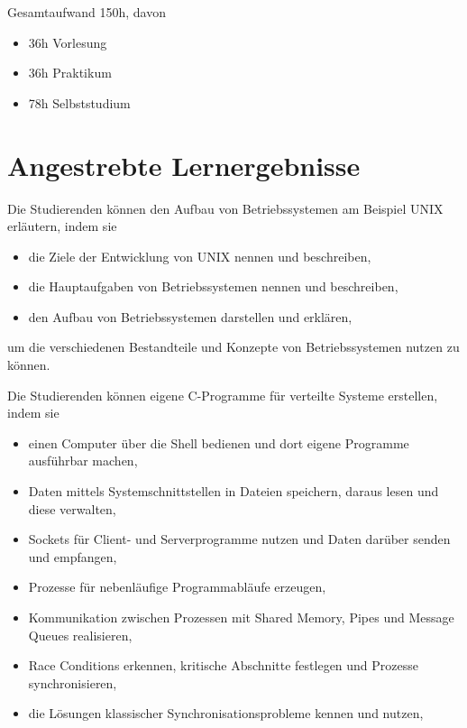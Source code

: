 Gesamtaufwand 150h, davon

\begin{itemize}
\tightlist
\item
  36h Vorlesung
\item
  36h Praktikum
\item
  78h Selbststudium
\end{itemize}

\section*{Angestrebte
Lernergebnisse\label{/mi-2017/modulbeschreibungen-bachelor/BA_betriebssysteme-und-verteile-systeme}}\label{angestrebte-lernergebnissepathlabelmi-2017modulbeschreibungen-bachelorbaux5fbetriebssysteme-und-verteile-systeme}

Die Studierenden können den Aufbau von Betriebssystemen am Beispiel UNIX
erläutern, indem sie

\begin{itemize}
\tightlist
\item
  die Ziele der Entwicklung von UNIX nennen und beschreiben,
\item
  die Hauptaufgaben von Betriebssystemen nennen und beschreiben,
\item
  den Aufbau von Betriebssystemen darstellen und erklären,
\end{itemize}

um die verschiedenen Bestandteile und Konzepte von Betriebssystemen
nutzen zu können.

Die Studierenden können eigene C-Programme für verteilte Systeme
erstellen, indem sie

\begin{itemize}
\tightlist
\item
  einen Computer über die Shell bedienen und dort eigene Programme
  ausführbar machen,
\item
  Daten mittels Systemschnittstellen in Dateien speichern, daraus lesen
  und diese verwalten,
\item
  Sockets für Client- und Serverprogramme nutzen und Daten darüber
  senden und empfangen,
\item
  Prozesse für nebenläufige Programmabläufe erzeugen,
\item
  Kommunikation zwischen Prozessen mit Shared Memory, Pipes und Message
  Queues realisieren,
\item
  Race Conditions erkennen, kritische Abschnitte festlegen und Prozesse
  synchronisieren,
\item
  die Lösungen klassischer Synchronisationsprobleme kennen und nutzen,
\end{itemize}

